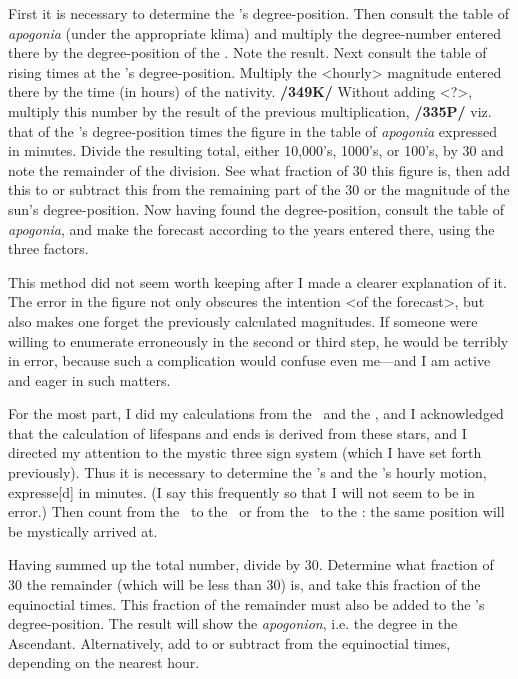 First it is necessary to determine the \Sun’s degree-position. Then consult the table of \textit{apogonia} (under the appropriate klima) and multiply the degree-number entered there by the degree-position of the \Sun. Note the result. Next consult the table of rising times at the \Sun’s degree-position. Multiply the <hourly> magnitude entered there by the time (in hours) of the nativity. \textbf{/349K/} Without adding <?>, multiply this number by the result of the previous multiplication, \textbf{/335P/} viz. that of the \Sun’s degree-position times the figure in the table of \textit{apogonia} expressed in minutes. Divide the resulting total, either 10,000’s, 1000’s, or 100’s, by 30 and note the remainder of the division. See what fraction of 30 this figure is, then add this to or subtract this from the remaining part of the 30 or the magnitude of the sun’s degree-position. Now having found the degree-position, consult the table of \textit{apogonia}, and make the forecast according to the years entered there, using the three factors.

This method did not seem worth keeping after I made a clearer explanation of it. The error in the figure not only obscures the intention <of the forecast>, but also makes one forget the previously calculated
magnitudes. If someone were willing to enumerate erroneously in the second or third step, he would be terribly in error, because such a complication would confuse even me—and I am active and eager in such matters.

For the most part, I did my calculations from the \Sun\, and the \Moon, and I acknowledged that the calculation of lifespans and ends is derived from these stars, and I directed my attention to the mystic three sign
system (which I have set forth previously). Thus it is necessary to determine the \Sun’s and the \Moon’s hourly motion, expresse[d] in minutes. (I say this frequently so that I will not seem to be in error.)
Then count from the \Sun\, to the \Moon\, or from the \Moon\, to the \Sun: the same position will be mystically arrived at. 

Having summed up the total number, divide by 30. Determine what fraction of 30 the remainder (which will be less than 30) is, and take this fraction of the equinoctial times. This fraction of the remainder must also be added to the \Sun’s degree-position. The result will show the \textit{apogonion}, i.e. the degree in the Ascendant. Alternatively, add to or subtract from the equinoctial times, depending on the
nearest hour.


